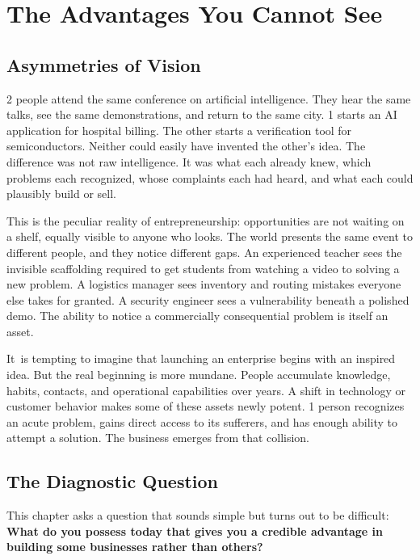 \section{The Advantages You Cannot See}

\subsection{Asymmetries of Vision}

2 people attend the same conference on artificial intelligence. They hear the same talks, see the same demonstrations, and return to the same city. 1 starts an AI application for hospital billing. The other starts a verification tool for semiconductors. Neither could easily have invented the other's idea. The difference was not raw intelligence. It was what each already knew, which problems each recognized, whose complaints each had heard, and what each could plausibly build or sell.

This is the peculiar reality of entrepreneurship: opportunities are not waiting on a shelf, equally visible to anyone who looks. The world presents the same event to different people, and they notice different gaps. An experienced teacher sees the invisible scaffolding required to get students from watching a video to solving a new problem. A logistics manager sees inventory and routing mistakes everyone else takes for granted. A security engineer sees a vulnerability beneath a polished demo. The ability to notice a commercially consequential problem is itself an asset.

It~is tempting to imagine that launching an enterprise begins with an inspired idea. But the real beginning is more mundane. People accumulate knowledge, habits, contacts, and operational capabilities over years. A shift in technology or customer behavior makes some of these assets newly potent. 1 person recognizes an acute problem, gains direct access to its sufferers, and has enough ability to attempt a solution. The business emerges from that collision.

\subsection{The Diagnostic Question}

This chapter asks a question that sounds simple but turns out to be difficult: \textbf{What do you possess today that gives you a credible advantage in building some businesses rather than others?}

